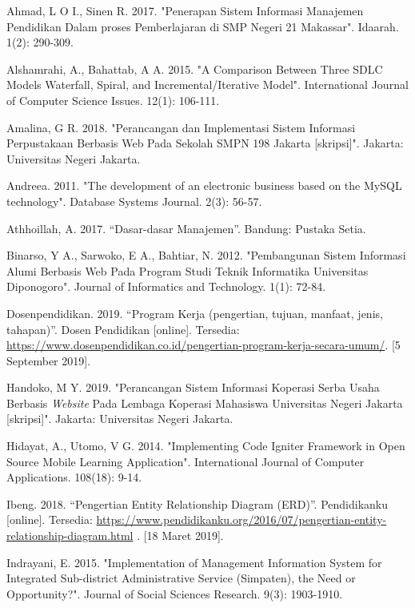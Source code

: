 \documentclass{jtetiskripsi}
\begin{document}
\begin{thebibliography}{99}
	
	 Ahmad, L O I., Sinen R. 2017. "Penerapan Sistem Informasi Manajemen Pendidikan Dalam proses Pemberlajaran di SMP Negeri 21 Makassar". Idaarah. 1(2): 290-309.
	
	 Alshamrahi, A.,  Bahattab, A A. 2015. "A Comparison Between Three SDLC Models Waterfall, Spiral, and Incremental/Iterative Model". International Journal of Computer Science Issues. 12(1): 106-111. 
	
	 Amalina, G R. 2018. "Perancangan dan Implementasi Sistem Informasi Perpustakaan Berbasis Web Pada Sekolah SMPN 198 Jakarta [skripsi]". Jakarta: Universitas Negeri Jakarta.
	
	 Andreea. 2011. "The development of an electronic business based on the MySQL technology". Database Systems Journal. 2(3): 56-57.
	
	 Athhoillah, A. 2017. “Dasar-dasar Manajemen”. Bandung: Pustaka Setia.
	
	 Binarso, Y A., Sarwoko, E A., Bahtiar, N. 2012. "Pembangunan Sistem Informasi Alumi Berbasis Web Pada Program Studi Teknik Informatika Universitas Diponogoro". Journal of Informatics and Technology. 1(1): 72-84.
	
	 Dosenpendidikan. 2019. “Program Kerja (pengertian, tujuan, manfaat, jenis, tahapan)”. Dosen Pendidikan [online]. Tersedia: \url{https://www.dosenpendidikan.co.id/pengertian-program-kerja-secara-umum/}. [5 September 2019].
	
	 Handoko, M Y. 2019. "Perancangan Sistem Informasi Koperasi Serba Usaha Berbasis \textit{Website} Pada Lembaga Koperasi Mahasiswa Universitas Negeri Jakarta [skripsi]". Jakarta: Universitas Negeri Jakarta.
	
	 Hidayat, A., Utomo, V G. 2014.  "Implementing Code Igniter Framework in Open Source Mobile Learning Application". International Journal of Computer Applications. 108(18): 9-14.
	
	 Ibeng. 2018. “Pengertian Entity Relationship Diagram (ERD)”. Pendidikanku [online]. Tersedia: \url{https://www.pendidikanku.org/2016/07/pengertian-entity-relationship-diagram.html} . [18 Maret 2019].
	
	 Indrayani, E. 2015. "Implementation of Management Information System for Integrated Sub-district Administrative Service (Simpaten), the Need or Opportunity?". Journal of Social Sciences Research. 9(3): 1903-1910.
	

\end{thebibliography}
\end{document}
